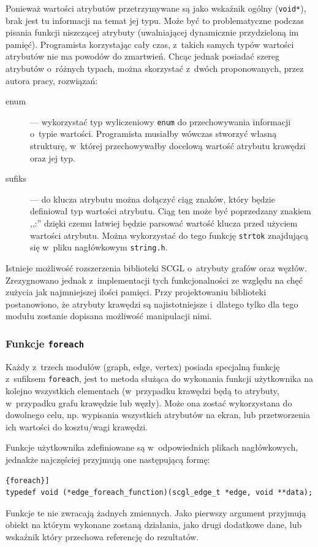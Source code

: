 \documentclass[a4paper,12pt,polish,oneside,openright]{thesis}
\newcommand\code[1]{\lstinline[style=line]{#1}}
\begin{document}
Ponieważ wartości atrybutów przetrzymywane są jako wskaźnik ogólny (\code{void*}), brak jest tu informacji na temat jej typu.
Może być to problematyczne podczas pisania funkcji niszczącej atrybuty (uwalniającej dynamicznie przydzieloną im pamięć).
Programista korzystając cały czas, z~takich samych typów wartości atrybutów nie ma powodów do zmartwień.
Chcąc jednak posiadać szereg atrybutów o~różnych typach, można skorzystać z~dwóch proponowanych, przez autora pracy, rozwiązań:
\begin{description}
	\item[enum] --- wykorzystać typ wyliczeniowy \code{enum} do przechowywania informacji o~typie wartości.
	Programista musiałby wówczas stworzyć własną strukturę, w~której przechowywałby docelową wartość atrybutu krawędzi oraz jej typ.
	\item[sufiks] --- do klucza atrybutu można dołączyć ciąg znaków, który będzie definiował typ wartości atrybutu.
	Ciąg ten może być poprzedzany znakiem ,,:'' dzięki czemu łatwiej będzie parsować wartość klucza przed użyciem wartości atrybutu.
	Można wykorzystać do tego funkcję \code{strtok} znajdującą się w~pliku nagłówkowym \code{string.h}.
\end{description}

Istnieje możliwość rozszerzenia biblioteki SCGL o~atrybuty grafów oraz węzłów.
Zrezygnowano jednak z~implementacji tych funkcjonalności ze względu na chęć zużycia jak najmniejszej ilości pamięci.
Przy projektowaniu biblioteki postanowiono, że atrybuty krawędzi są najistotniejsze i~dlatego tylko dla tego modułu zostanie dopisana możliwość manipulacji nimi.

\subsubsection*{Funkcje \code{foreach}}
\label{sec:foreach}
Każdy z~trzech modułów (graph, edge, vertex) posiada specjalną funkcję z~sufiksem \code{foreach}, jest to metoda służąca do wykonania funkcji użytkownika na kolejno wszystkich elementach (w~przypadku krawędzi będą to atrybuty, w~przypadku grafu krawędzie lub węzły).
Może ona zostać wykorzystana do dowolnego celu, np. wypisania wszystkich atrybutów na ekran, lub przetworzenia ich wartości do kosztu/wagi krawędzi.

Funkcje użytkownika zdefiniowane są w~odpowiednich plikach nagłówkowych, jednakże najczęściej przyjmują one następującą formę:
\begin{lstlisting}[style=coden,caption=Przykładowa definicja funkcji użytkownika na potrzeby funkcji \code{foreach}]
typedef void (*edge_foreach_function)(scgl_edge_t *edge, void **data);
\end{lstlisting}
Funkcje te nie zwracają żadnych zmiennych.
Jako pierwszy argument przyjmują obiekt na którym wykonane zostaną działania, jako drugi dodatkowe dane, lub wskaźnik który przechowa referencję do rezultatów.
\end{document}
